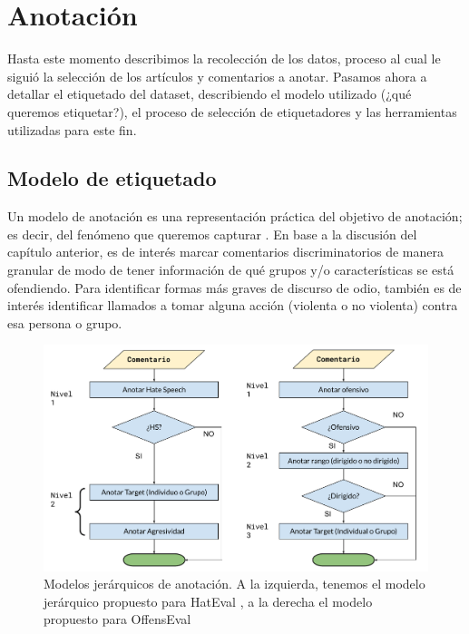\section{Anotación}

Hasta este momento describimos la recolección de los datos, proceso al cual le siguió la selección de los artículos y comentarios a anotar. Pasamos ahora a detallar el etiquetado del dataset, describiendo el modelo utilizado (¿qué queremos etiquetar?), el proceso de selección de etiquetadores y las herramientas utilizadas para este fin.


\subsection{Modelo de etiquetado}


Un modelo de anotación es una representación práctica del objetivo de anotación; es decir, del fenómeno que queremos capturar \cite{pustejovsky2012natural}. En base a la discusión del capítulo anterior, es de interés marcar comentarios discriminatorios de manera granular de modo de tener información de qué grupos y/o características se está ofendiendo. Para identificar formas más graves de discurso de odio, también es de interés identificar llamados a tomar alguna acción (violenta o no violenta) contra esa persona o grupo.

\begin{figure}
    \centering
    \includegraphics[width=\textwidth]{img/05/modelos_jerarquicos.pdf}
    \caption{Modelos jerárquicos de anotación. A la izquierda, tenemos el modelo jerárquico propuesto para HatEval \cite{hateval2019semeval}, a la derecha el modelo propuesto para OffensEval \cite{zampieri2019semeval2019}}
    \label{fig:modelos_offenseval_hateval}
\end{figure}


